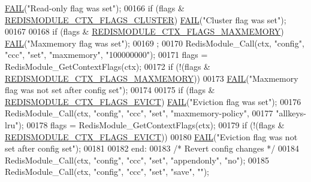 \begin{DoxyCode}
{      \hyperlink{testmodule_8c_a292ad803e75cf5ca00676b8595513ace}{FAIL}(\textcolor{stringliteral}{"Read-only flag was set"});
00166     \textcolor{keywordflow}{if} (flags & \hyperlink{redismodule_8h_a5c34f8b64241bbbd00bc3df9c3c08844}{REDISMODULE\_CTX\_FLAGS\_CLUSTER}) 
      \hyperlink{testmodule_8c_a292ad803e75cf5ca00676b8595513ace}{FAIL}(\textcolor{stringliteral}{"Cluster flag was set"});
00167 
00168     \textcolor{keywordflow}{if} (flags & \hyperlink{redismodule_8h_a8c676eb00ac368cca7c8515aa115213d}{REDISMODULE\_CTX\_FLAGS\_MAXMEMORY}) 
      \hyperlink{testmodule_8c_a292ad803e75cf5ca00676b8595513ace}{FAIL}(\textcolor{stringliteral}{"Maxmemory flag was set"});
00169     ;
00170     RedisModule\_Call(ctx, \textcolor{stringliteral}{"config"}, \textcolor{stringliteral}{"ccc"}, \textcolor{stringliteral}{"set"}, \textcolor{stringliteral}{"maxmemory"}, \textcolor{stringliteral}{"100000000"});
00171     flags = RedisModule\_GetContextFlags(ctx);
00172     \textcolor{keywordflow}{if} (!(flags & \hyperlink{redismodule_8h_a8c676eb00ac368cca7c8515aa115213d}{REDISMODULE\_CTX\_FLAGS\_MAXMEMORY}))
00173       \hyperlink{testmodule_8c_a292ad803e75cf5ca00676b8595513ace}{FAIL}(\textcolor{stringliteral}{"Maxmemory flag was not set after config set"});
00174 
00175     \textcolor{keywordflow}{if} (flags & \hyperlink{redismodule_8h_acc6e7822ea410be48f1006b39cf8c487}{REDISMODULE\_CTX\_FLAGS\_EVICT}) 
      \hyperlink{testmodule_8c_a292ad803e75cf5ca00676b8595513ace}{FAIL}(\textcolor{stringliteral}{"Eviction flag was set"});
00176     RedisModule\_Call(ctx, \textcolor{stringliteral}{"config"}, \textcolor{stringliteral}{"ccc"}, \textcolor{stringliteral}{"set"}, \textcolor{stringliteral}{"maxmemory-policy"},
00177                      \textcolor{stringliteral}{"allkeys-lru"});
00178     flags = RedisModule\_GetContextFlags(ctx);
00179     \textcolor{keywordflow}{if} (!(flags & \hyperlink{redismodule_8h_acc6e7822ea410be48f1006b39cf8c487}{REDISMODULE\_CTX\_FLAGS\_EVICT}))
00180       \hyperlink{testmodule_8c_a292ad803e75cf5ca00676b8595513ace}{FAIL}(\textcolor{stringliteral}{"Eviction flag was not set after config set"});
00181 
00182   end:
00183     \textcolor{comment}{/* Revert config changes */}
00184     RedisModule\_Call(ctx, \textcolor{stringliteral}{"config"}, \textcolor{stringliteral}{"ccc"}, \textcolor{stringliteral}{"set"}, \textcolor{stringliteral}{"appendonly"}, \textcolor{stringliteral}{"no"});
00185     RedisModule\_Call(ctx, \textcolor{stringliteral}{"config"}, \textcolor{stringliteral}{"ccc"}, \textcolor{stringliteral}{"set"}, \textcolor{stringliteral}{"save"}, \textcolor{stringliteral}{""});
}
\end{DoxyCode}
